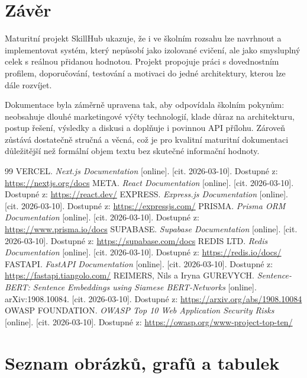 \documentclass[12pt,a4paper]{report}
\begin{document}
\chapter*{Závěr}
Maturitní projekt SkillHub ukazuje, že i ve školním rozsahu lze navrhnout a implementovat systém, který nepůsobí jako izolované cvičení, ale jako smysluplný celek s reálnou přidanou hodnotou. Projekt propojuje práci s dovednostním profilem, doporučování, testování a motivaci do jedné architektury, kterou lze dále rozvíjet.

Dokumentace byla záměrně upravena tak, aby odpovídala školním pokynům: neobsahuje dlouhé marketingové výčty technologií, klade důraz na architekturu, postup řešení, výsledky a diskusi a doplňuje i povinnou API přílohu. Zároveň zůstává dostatečně stručná a věcná, což je pro kvalitní maturitní dokumentaci důležitější než formální objem textu bez skutečné informační hodnoty.

\clearpage
{}
\begin{thebibliography}{99}
 VERCEL. \textit{Next.js Documentation} [online]. [cit. 2026-03-10]. Dostupné z: \url{https://nextjs.org/docs}
 META. \textit{React Documentation} [online]. [cit. 2026-03-10]. Dostupné z: \url{https://react.dev/}
 EXPRESS. \textit{Express.js Documentation} [online]. [cit. 2026-03-10]. Dostupné z: \url{https://expressjs.com/}
 PRISMA. \textit{Prisma ORM Documentation} [online]. [cit. 2026-03-10]. Dostupné z: \url{https://www.prisma.io/docs}
 SUPABASE. \textit{Supabase Documentation} [online]. [cit. 2026-03-10]. Dostupné z: \url{https://supabase.com/docs}
 REDIS LTD. \textit{Redis Documentation} [online]. [cit. 2026-03-10]. Dostupné z: \url{https://redis.io/docs/}
 FASTAPI. \textit{FastAPI Documentation} [online]. [cit. 2026-03-10]. Dostupné z: \url{https://fastapi.tiangolo.com/}
 REIMERS, Nils a Iryna GUREVYCH. \textit{Sentence-BERT: Sentence Embeddings using Siamese BERT-Networks} [online]. arXiv:1908.10084. [cit. 2026-03-10]. Dostupné z: \url{https://arxiv.org/abs/1908.10084}
 OWASP FOUNDATION. \textit{OWASP Top 10 Web Application Security Risks} [online]. [cit. 2026-03-10]. Dostupné z: \url{https://owasp.org/www-project-top-ten/}
\end{thebibliography}

\clearpage
\chapter*{Seznam obrázků, grafů a tabulek}
\listoffigures
\vspace{1cm}
\listoftables
\end{document}
